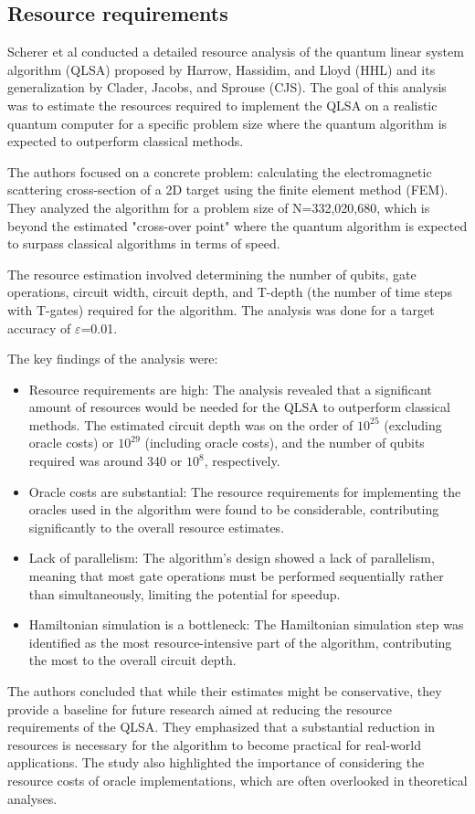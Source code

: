 \documentclass[12pt]{extarticle}
\begin{document}
\subsection{Resource requirements}


Scherer et al\cite{scherer2017concrete} conducted a detailed resource analysis of the quantum linear system algorithm (QLSA) proposed by Harrow, Hassidim, and Lloyd (HHL) and its generalization by Clader, Jacobs, and Sprouse (CJS).
The goal of this analysis was to estimate the resources required to implement the QLSA on a realistic quantum computer for a specific problem size where the quantum algorithm is expected to outperform classical methods.

The authors focused on a concrete problem: calculating the electromagnetic scattering cross-section of a 2D target using the finite element method (FEM). They analyzed the algorithm for a problem size of N=332,020,680, which is beyond the estimated "cross-over point" where the quantum algorithm is expected to surpass classical algorithms in terms of speed.

The resource estimation involved determining the number of qubits, gate operations, circuit width, circuit depth, and T-depth
(the number of time steps with T-gates) required for the algorithm. The analysis was done for a target accuracy of $\varepsilon$=0.01.

The key findings of the analysis were:
\begin{itemize}
\item Resource requirements are high: The analysis revealed that a significant amount of resources would be needed for the QLSA to outperform classical methods.
The estimated circuit depth was on the order of $10^{25}$ (excluding oracle costs) or $10^{29}$ (including oracle costs), and the number of qubits required was around 340 or $10^8$, respectively.
\item Oracle costs are substantial: The resource requirements for implementing the oracles used in the algorithm were found to be considerable, contributing significantly to the overall resource estimates.
\item Lack of parallelism: The algorithm's design showed a lack of parallelism, meaning that most gate operations must be performed sequentially rather than simultaneously, limiting the potential for speedup.
\item Hamiltonian simulation is a bottleneck: The Hamiltonian simulation step was identified as the most resource-intensive part of the algorithm, contributing the most to the overall circuit depth.
\end{itemize}
The authors concluded that while their estimates might be conservative, they provide a baseline for future research aimed at reducing the resource requirements of the QLSA.
They emphasized that a substantial reduction in resources is necessary for the algorithm to become practical for real-world applications.
The study also highlighted the importance of considering the resource costs of oracle implementations, which are often overlooked in theoretical analyses.
\end{document}
